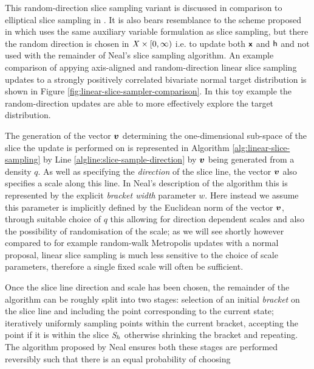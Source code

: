 This random-direction slice sampling variant is discussed in comparison to elliptical slice sampling in \citep{murray2010elliptical}. It is also bears resemblance to the scheme proposed in \citep{chen1998toward} which uses the same auxiliary variable formulation as slice sampling, but there the random direction is chosen in $\mathit{X}\times[0,\infty)$ i.e. to update both $\boldsymbol{\mathsf{x}}$ and $\mathsf{h}$ and not used with the remainder of Neal's slice sampling algorithm. An example comparison of appying axis-aligned and random-direction linear slice sampling updates to a strongly positively correlated bivariate normal target distribution is shown in Figure \ref{fig:linear-slice-sampler-comparison}. In this toy example the random-direction updates are able to more effectively explore the target distribution.

The generation of the vector $\boldsymbol{v}$ determining the one-dimensional sub-space of the slice the update is performed on is represented in Algorithm \ref{alg:linear-slice-sampling} by Line \ref{algline:slice-sample-direction} by $\boldsymbol{v}$ being generated from a density $q$. As well as specifying the \emph{direction} of the slice line, the vector $\boldsymbol{v}$ also specifies a scale along this line. In Neal's description of the algorithm this is represented by the explicit \emph{bracket width} parameter $w$. Here instead we assume this parameter is implicitly defined by the Euclidean norm of the vector $\boldsymbol{v}$, through suitable choice of $q$ this allowing for direction dependent scales and also the possibility of randomisation of the scale; as we will see shortly however compared to for example random-walk Metropolis updates with a normal proposal, linear slice sampling is much less sensitive to the choice of scale parameters, therefore a single fixed scale will often be sufficient.

Once the slice line direction and scale has been chosen, the remainder of the algorithm can be roughly split into two stages: selection of an initial \emph{bracket} on the slice line and including the point corresponding to the current state; iteratively uniformly sampling points within the current bracket, accepting the point if it is within the slice $\mathit{S}_h$ otherwise shrinking the bracket and repeating. The algorithm proposed by Neal ensures both these stages are performed reversibly such that there is an equal probability of choosing

